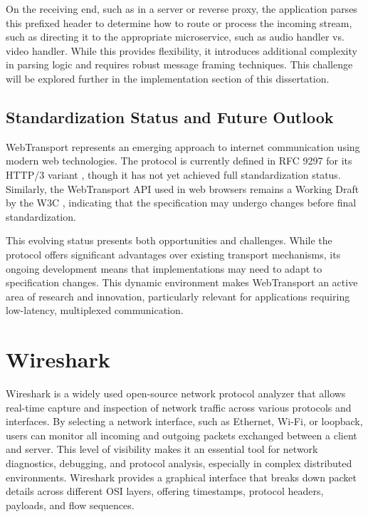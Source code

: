 On the receiving end, such as in a server or reverse proxy, the application parses this prefixed header to determine how to route or process the incoming stream, such as directing it to the appropriate microservice, such as audio handler vs. video handler. While this provides flexibility, it introduces additional complexity in parsing logic and requires robust message framing techniques. This challenge will be explored further in the implementation section of this dissertation.

\subsection{Standardization Status and Future Outlook}

WebTransport represents an emerging approach to internet communication using modern web technologies. The protocol is currently defined in RFC 9297 for its HTTP/3 variant \cite{webtransport-draft}, though it has not yet achieved full standardization status. Similarly, the WebTransport API used in web browsers remains a Working Draft by the W3C \cite{webtransport-w3c}, indicating that the specification may undergo changes before final standardization.

This evolving status presents both opportunities and challenges. While the protocol offers significant advantages over existing transport mechanisms, its ongoing development means that implementations may need to adapt to specification changes. This dynamic environment makes WebTransport an active area of research and innovation, particularly relevant for applications requiring low-latency, multiplexed communication.


\section{Wireshark}

Wireshark is a widely used open-source network protocol analyzer that allows real-time capture and inspection of network traffic across various protocols and interfaces. By selecting a network interface, such as Ethernet, Wi-Fi, or loopback, users can monitor all incoming and outgoing packets exchanged between a client and server. This level of visibility makes it an essential tool for network diagnostics, debugging, and protocol analysis, especially in complex distributed environments. Wireshark provides a graphical interface that breaks down packet details across different OSI layers, offering timestamps, protocol headers, payloads, and flow sequences.

